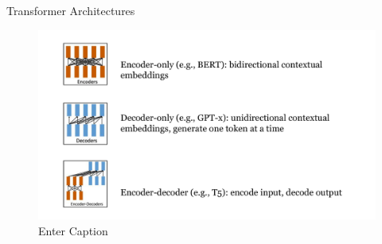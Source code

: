 \documentclass[serif, aspectratio=169]{beamer}
\begin{document}
\begin{frame}{Transformer Architectures}
    \begin{figure}
        \centering
        \includegraphics[width=0.9\linewidth]{Figures/Untitled presentation (3).pdf}
        \caption{Enter Caption}
        \label{fig:enter-label}
    \end{figure}
\end{frame}
\end{document}
